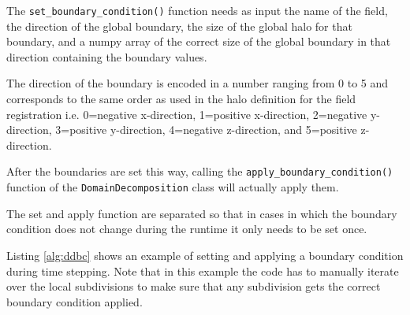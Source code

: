 The \texttt{set\_boundary\_condition()} function needs as input the name of the field, the direction of the global boundary, the size of the global halo for that boundary, and a numpy array of the correct size of the global boundary in that direction containing the boundary values.

The direction of the boundary is encoded in a number ranging from 0 to 5 and corresponds to the same order as used in the halo definition for the field registration i.e. 0=negative x-direction, 1=positive x-direction, 2=negative y-direction, 3=positive y-direction, 4=negative z-direction, and 5=positive z-direction.

After the boundaries are set this way, calling the \texttt{apply\_boundary\_condition()} function of the \texttt{DomainDecomposition} class will actually apply them.

The set and apply function are separated so that in cases in which the boundary condition does not change during the runtime it only needs to be set once.

Listing \ref{alg:ddbc} shows an example of setting and applying a boundary condition during time stepping.
Note that in this example the code has to manually iterate over the local subdivisions to make sure that any subdivision gets the correct boundary condition applied.


